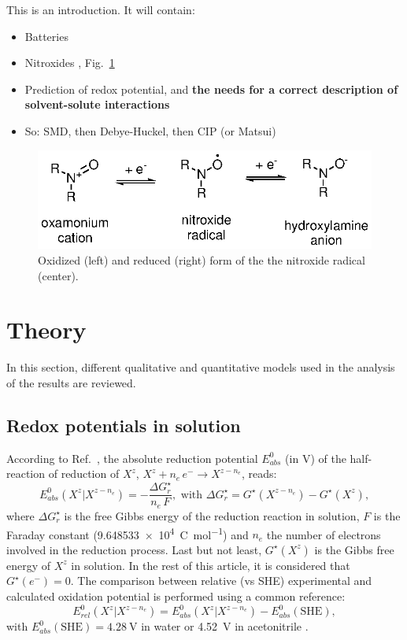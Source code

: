 \documentclass[review]{elsarticle}
\begin{document}
This is an introduction. It will contain:\begin{itemize}
	\item Batteries
	\item Nitroxides \cite{souleChemistryBiologyNitroxide2007}, Fig.~\ref{fig:states} 
	\item Prediction of redox potential, and \textbf{the needs for a correct description of solvent-solute interactions}
	\item So: SMD, then Debye-Huckel, then CIP (or Matsui)
\end{itemize}

\begin{figure}[!h]
	\centering
	\includegraphics[width=.5\linewidth]{Figure1}
	\caption{Oxidized (left) and reduced (right) form of the the nitroxide radical (center).}
	\label{fig:states}
\end{figure}

\section{Theory}

In this section, different qualitative and quantitative models used in the analysis of the results are reviewed.

\subsection{Redox potentials in solution}

According to Ref.~\cite{marenichComputationalElectrochemistryPrediction2014}, the absolute reduction potential $E_{abs}^0$ (in \si{\volt}) of the half-reaction of reduction of $X^z$, $X^{z} + n_e\,e^- \rightarrow X^{z-n_e}$, reads: \begin{equation}
	E_{abs}^0(X^{z}|X^{z-n_e}) = -\frac{\Delta G_{r}^\star}{n_e\,F}, \text{ with } \Delta G_{r}^\star = G^\star(X^{z-n_e}) - G^\star(X^z), \label{eq:nernst}
\end{equation}
where $\Delta G_{r}^\star$ is the free Gibbs energy of the reduction reaction in solution, $F$ is the Faraday constant (\SI{9.648533e4}{\coulomb\per\mole}) and $n_e$ the number of electrons involved in the reduction process. Last but not least, $G^\star(X^z)$ is the Gibbs free energy of $X^z$ in solution.  In the rest of this article, it is considered that $G^\star(e^-) = 0$.
The comparison between relative (vs SHE) experimental and calculated oxidation potential is performed using a common reference:\begin{equation}
	E^0_{rel}(X^z|X^{z-n_e})  = E^0_{abs}(X^z|X^{z-n_e}) - E^{0}_{abs}(\text{SHE}), \label{eq:ecalc}
\end{equation}
with $E^0_{abs}(\text{SHE}) = \SI{4.28}{\volt}$ in water or \SI{4.52}{\volt} in acetonitrile \cite{marenichComputationalElectrochemistryPrediction2014}.
\end{document}
